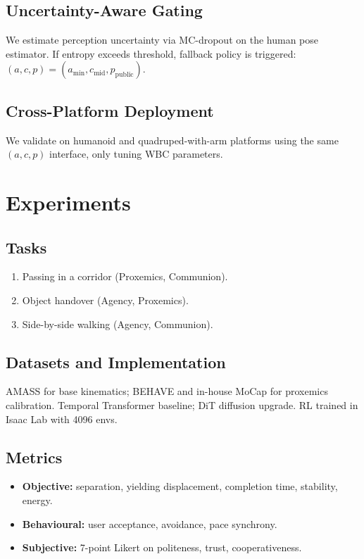 \documentclass[journal]{IEEEtran}
\begin{document}
\subsection{Uncertainty-Aware Gating}
We estimate perception uncertainty via MC-dropout on the human pose estimator. If entropy exceeds threshold, fallback policy is triggered: $(a, c, p) = (a_{\min}, c_{\text{mid}}, p_{\text{public}})$.

\subsection{Cross-Platform Deployment}
We validate on humanoid and quadruped-with-arm platforms using the same $(a, c, p)$ interface, only tuning WBC parameters.

\section{Experiments}\label{sec:exp}

\subsection{Tasks}
\begin{enumerate}
\item Passing in a corridor (Proxemics, Communion).
\item Object handover (Agency, Proxemics).
\item Side-by-side walking (Agency, Communion).
\end{enumerate}

\subsection{Datasets and Implementation}
AMASS for base kinematics; BEHAVE and in-house MoCap for proxemics calibration. Temporal Transformer baseline; DiT diffusion upgrade. RL trained in Isaac Lab with 4096 envs.

\subsection{Metrics}
\begin{itemize}
\item \textbf{Objective:} separation, yielding displacement, completion time, stability, energy.
\item \textbf{Behavioural:} user acceptance, avoidance, pace synchrony.
\item \textbf{Subjective:} 7-point Likert on politeness, trust, cooperativeness.
\end{itemize}
\end{document}
